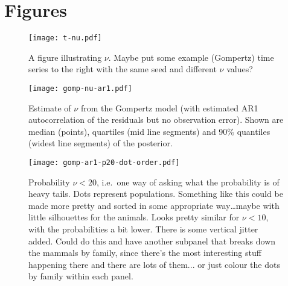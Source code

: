\documentclass[10pt]{article}
\begin{document}
\clearpage



%
%
%
%








\section{Figures}

\begin{figure}[htbp]
\begin{center}
\texttt{[image: t-nu.pdf]}
\caption{A figure illustrating $\nu$. Maybe put some example (Gompertz) time series to the right with the same seed and different $\nu$ values?}
\label{default}
\end{center}
\end{figure}

\clearpage

\begin{figure}[htbp]
\begin{center}
\texttt{[image: gomp-nu-ar1.pdf]}
\caption{Estimate of $\nu$ from the Gompertz model (with estimated AR1 autocorrelation of the residuals but no observation error). Shown are median (points), quartiles (mid line segments) and 90\% quantiles (widest line segments) of the posterior.}
\label{fig:nu-coefs}
\end{center}
\end{figure}

\clearpage

\begin{figure}[htbp]
\begin{center}
\texttt{[image: gomp-ar1-p20-dot-order.pdf]}
\caption{Probability $\nu<20$, i.e.\ one way of asking what the probability is of heavy tails. Dots represent populations. Something like this could be made more pretty and sorted in some appropriate way\ldots maybe with little silhouettes for the animals. Looks pretty similar for $\nu < 10$, with the probabilities a bit lower. There is some vertical jitter added. Could do this and have another subpanel that breaks down the mammals by family, since there's the most interesting stuff happening there and there are lots of them... or just colour the dots by family within each panel.}
\label{fig:dots}
\end{center}
\end{figure}
\end{document}
